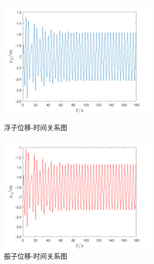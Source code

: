 \documentclass{my_paper}
\begin{document}
\begin{figure}[!ht]
    \centering
    \begin{minipage}[t]{0.48\textwidth}
    \centering
    \includegraphics[width=8cm]{1-1f.png}
    \caption{浮子位移-时间关系图}
    \end{minipage}
    \begin{minipage}[t]{0.48\textwidth}
    \centering
    \includegraphics[width=8cm]{1-1o.png}
    \caption{振子位移-时间关系图}
    \end{minipage}
    \end{figure}
\end{document}
